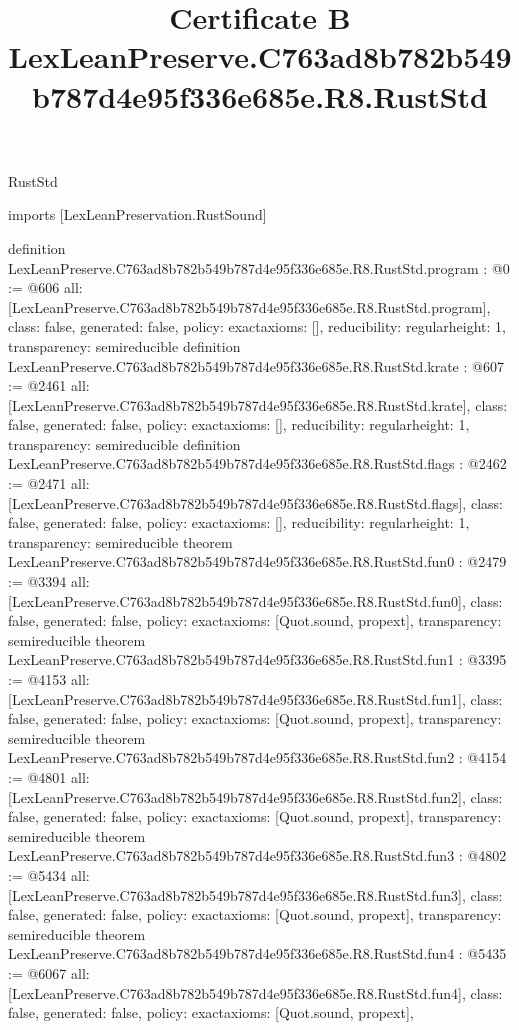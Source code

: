 \begin{lexlean}{RustStd}
\title{Certificate B LexLeanPreserve.C763ad8b782b549b787d4e95f336e685e.R8.RustStd}
\begin{coremodule}
imports [LexLeanPreservation.RustSound]

definition LexLeanPreserve.C763ad8b782b549b787d4e95f336e685e.R8.RustStd.program : @0 := @606 {
  all: [LexLeanPreserve.C763ad8b782b549b787d4e95f336e685e.R8.RustStd.program],
  class: false,
  generated: false,
  policy: exact{axioms: []},
  reducibility: regular{height: 1},
  transparency: semireducible
}
definition LexLeanPreserve.C763ad8b782b549b787d4e95f336e685e.R8.RustStd.krate : @607 := @2461 {
  all: [LexLeanPreserve.C763ad8b782b549b787d4e95f336e685e.R8.RustStd.krate],
  class: false,
  generated: false,
  policy: exact{axioms: []},
  reducibility: regular{height: 1},
  transparency: semireducible
}
definition LexLeanPreserve.C763ad8b782b549b787d4e95f336e685e.R8.RustStd.flags : @2462 := @2471 {
  all: [LexLeanPreserve.C763ad8b782b549b787d4e95f336e685e.R8.RustStd.flags],
  class: false,
  generated: false,
  policy: exact{axioms: []},
  reducibility: regular{height: 1},
  transparency: semireducible
}
theorem LexLeanPreserve.C763ad8b782b549b787d4e95f336e685e.R8.RustStd.fun0 : @2479 := @3394 {
  all: [LexLeanPreserve.C763ad8b782b549b787d4e95f336e685e.R8.RustStd.fun0],
  class: false,
  generated: false,
  policy: exact{axioms: [Quot.sound, propext]},
  transparency: semireducible
}
theorem LexLeanPreserve.C763ad8b782b549b787d4e95f336e685e.R8.RustStd.fun1 : @3395 := @4153 {
  all: [LexLeanPreserve.C763ad8b782b549b787d4e95f336e685e.R8.RustStd.fun1],
  class: false,
  generated: false,
  policy: exact{axioms: [Quot.sound, propext]},
  transparency: semireducible
}
theorem LexLeanPreserve.C763ad8b782b549b787d4e95f336e685e.R8.RustStd.fun2 : @4154 := @4801 {
  all: [LexLeanPreserve.C763ad8b782b549b787d4e95f336e685e.R8.RustStd.fun2],
  class: false,
  generated: false,
  policy: exact{axioms: [Quot.sound, propext]},
  transparency: semireducible
}
theorem LexLeanPreserve.C763ad8b782b549b787d4e95f336e685e.R8.RustStd.fun3 : @4802 := @5434 {
  all: [LexLeanPreserve.C763ad8b782b549b787d4e95f336e685e.R8.RustStd.fun3],
  class: false,
  generated: false,
  policy: exact{axioms: [Quot.sound, propext]},
  transparency: semireducible
}
theorem LexLeanPreserve.C763ad8b782b549b787d4e95f336e685e.R8.RustStd.fun4 : @5435 := @6067 {
  all: [LexLeanPreserve.C763ad8b782b549b787d4e95f336e685e.R8.RustStd.fun4],
  class: false,
  generated: false,
  policy: exact{axioms: [Quot.sound, propext]},
}
\end{coremodule}
\end{lexlean}
